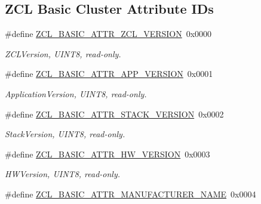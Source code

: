\subsection*{Z\-C\-L Basic Cluster Attribute I\-Ds}
\begin{DoxyCompactItemize}
\item 
\hypertarget{group__zcl__basic_ga3680b891bc5b62eeb20ad9d65502e2ee}{\#define \hyperlink{group__zcl__basic_ga3680b891bc5b62eeb20ad9d65502e2ee}{Z\-C\-L\-\_\-\-B\-A\-S\-I\-C\-\_\-\-A\-T\-T\-R\-\_\-\-Z\-C\-L\-\_\-\-V\-E\-R\-S\-I\-O\-N}~0x0000}\label{group__zcl__basic_ga3680b891bc5b62eeb20ad9d65502e2ee}

\begin{DoxyCompactList}\small\item\em Z\-C\-L\-Version, U\-I\-N\-T8, read-\/only. \end{DoxyCompactList}\item 
\hypertarget{group__zcl__basic_gab278ad4794718034db8bd583ed019fe7}{\#define \hyperlink{group__zcl__basic_gab278ad4794718034db8bd583ed019fe7}{Z\-C\-L\-\_\-\-B\-A\-S\-I\-C\-\_\-\-A\-T\-T\-R\-\_\-\-A\-P\-P\-\_\-\-V\-E\-R\-S\-I\-O\-N}~0x0001}\label{group__zcl__basic_gab278ad4794718034db8bd583ed019fe7}

\begin{DoxyCompactList}\small\item\em Application\-Version, U\-I\-N\-T8, read-\/only. \end{DoxyCompactList}\item 
\hypertarget{group__zcl__basic_ga88bf0168f55c3addbe3c2ba54c8095b1}{\#define \hyperlink{group__zcl__basic_ga88bf0168f55c3addbe3c2ba54c8095b1}{Z\-C\-L\-\_\-\-B\-A\-S\-I\-C\-\_\-\-A\-T\-T\-R\-\_\-\-S\-T\-A\-C\-K\-\_\-\-V\-E\-R\-S\-I\-O\-N}~0x0002}\label{group__zcl__basic_ga88bf0168f55c3addbe3c2ba54c8095b1}

\begin{DoxyCompactList}\small\item\em Stack\-Version, U\-I\-N\-T8, read-\/only. \end{DoxyCompactList}\item 
\hypertarget{group__zcl__basic_gab2ab6140eb1374b9a82a56342a0b0fff}{\#define \hyperlink{group__zcl__basic_gab2ab6140eb1374b9a82a56342a0b0fff}{Z\-C\-L\-\_\-\-B\-A\-S\-I\-C\-\_\-\-A\-T\-T\-R\-\_\-\-H\-W\-\_\-\-V\-E\-R\-S\-I\-O\-N}~0x0003}\label{group__zcl__basic_gab2ab6140eb1374b9a82a56342a0b0fff}

\begin{DoxyCompactList}\small\item\em H\-W\-Version, U\-I\-N\-T8, read-\/only. \end{DoxyCompactList}\item 
\hypertarget{group__zcl__basic_ga4d657421aaf3ce5419e0e5d9ff6efcda}{\#define \hyperlink{group__zcl__basic_ga4d657421aaf3ce5419e0e5d9ff6efcda}{Z\-C\-L\-\_\-\-B\-A\-S\-I\-C\-\_\-\-A\-T\-T\-R\-\_\-\-M\-A\-N\-U\-F\-A\-C\-T\-U\-R\-E\-R\-\_\-\-N\-A\-M\-E}~0x0004}\label{group__zcl__basic_ga4d657421aaf3ce5419e0e5d9ff6efcda}


\end{DoxyCompactItemize}
